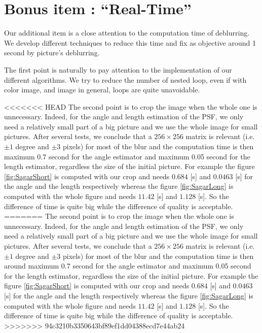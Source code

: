 
\section{Bonus item : ``Real-Time''}

Our additional item is a close attention to the computation time of deblurring.
We develop different techniques to reduce this time and fix as objective around 1 second by picture's deblurring.

The first point is naturally to pay attention to the implementation of our different algorithms. We try to reduce the number of nested loop, even if with color image, and image in general, loops are quite unavoidable.

<<<<<<< HEAD
The second point is to crop the image when the whole one is unnecessary. Indeed, for the angle and length estimation of the PSF, we only need a relatively small part of a big picture and we  use the whole image for small pictures. After several tests, we conclude that a $256 \times 256 $ matrix is relevant (i.e. $\pm 1$ degree and $\pm 3$ pixels) for most of the blur and the computation time is then maximum 0.7 second for the angle estimator and maximum 0.05 second for the length estimator, regardless the size of the initial picture. For example the figure \ref{fig:SagarShort} is computed with our crop and needs $0.684 $ [s] and $0.0463$ [s] for the angle and the length respectively whereas the figure \ref{fig:SagarLong} is computed with the whole figure and needs $11.42$ [s] and $1.128$ [s]. So the difference of time is quite big while the difference of quality is acceptable. 
=======
The second point is to crop the image when the whole one is unnecessary. Indeed, for the angle and length estimation of the PSF, we only need a relatively small part of a big picture and we  use the whole image for small pictures. After several tests, we conclude that a $256 \times 256 $ matrix is relevant (i.e. $\pm 1$ degree and $\pm 3$ pixels) for most of the blur and the computation time is then around maximum 0.7 second for the angle estimator and maximum 0.05 second for the length estimator, regardless the size of the initial picture. For example the figure \ref{fig:SagarShort} is computed with our crop and needs $0.684 $ [s] and $0.0463$ [s] for the angle and the length respectively whereas the figure \ref{fig:SagarLong} is computed with the whole figure and needs $11.42$ [s] and $1.128$ [s]. So the difference of time is quite big while the difference of quality is acceptable.
>>>>>>> 94c3210b3350643bf89ef1dd04388ecd7e44ab24
